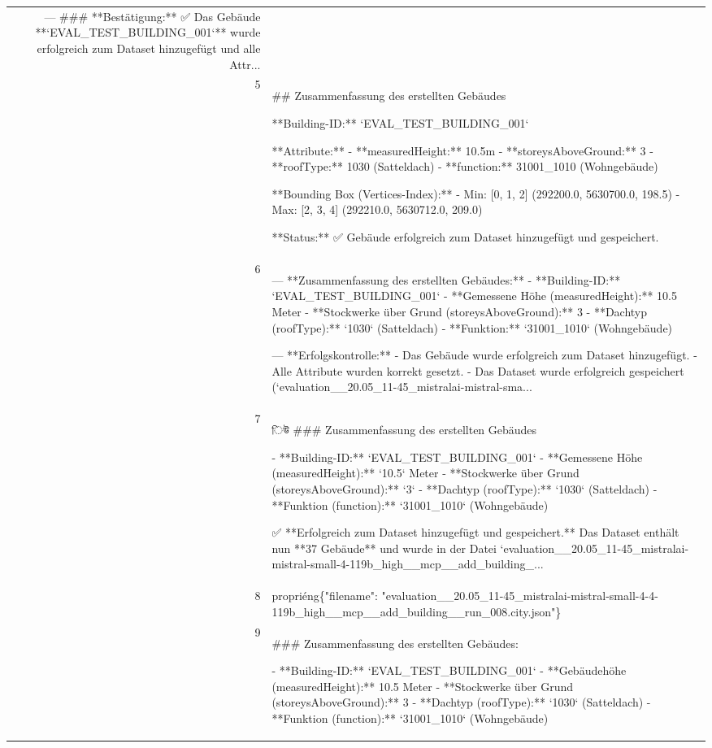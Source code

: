 \documentclass[a4paper,11pt]{article}
\begin{document}
\begin{table}[ht]
\begin{tabular}{r p{12cm}}
---
\#\#\# **Bestätigung:**
✅ Das Gebäude **`EVAL\_TEST\_BUILDING\_001`** wurde erfolgreich zum Dataset hinzugefügt und alle Attr... \\
5 & \#\# Zusammenfassung des erstellten Gebäudes

**Building-ID:** `EVAL\_TEST\_BUILDING\_001`

**Attribute:**
- **measuredHeight:** 10.5m
- **storeysAboveGround:** 3
- **roofType:** 1030 (Satteldach)
- **function:** 31001\_1010 (Wohngebäude)

**Bounding Box (Vertices-Index):**
- Min: [0, 1, 2] (292200.0, 5630700.0, 198.5)
- Max: [2, 3, 4] (292210.0, 5630712.0, 209.0)

**Status:** ✅ Gebäude erfolgreich zum Dataset hinzugefügt und gespeichert. \\
6 & ---
**Zusammenfassung des erstellten Gebäudes:**
- **Building-ID:** `EVAL\_TEST\_BUILDING\_001`
- **Gemessene Höhe (measuredHeight):** 10.5 Meter
- **Stockwerke über Grund (storeysAboveGround):** 3
- **Dachtyp (roofType):** `1030` (Satteldach)
- **Funktion:** `31001\_1010` (Wohngebäude)

---
**Erfolgskontrolle:**
- Das Gebäude wurde erfolgreich zum Dataset hinzugefügt.
- Alle Attribute wurden korrekt gesetzt.
- Das Dataset wurde erfolgreich gespeichert (`evaluation\_\_20.05\_11-45\_mistralai-mistral-sma... \\
7 & িউ
\#\#\# Zusammenfassung des erstellten Gebäudes

- **Building-ID:** `EVAL\_TEST\_BUILDING\_001`
- **Gemessene Höhe (measuredHeight):** `10.5` Meter
- **Stockwerke über Grund (storeysAboveGround):** `3`
- **Dachtyp (roofType):** `1030` (Satteldach)
- **Funktion (function):** `31001\_1010` (Wohngebäude)

✅ **Erfolgreich zum Dataset hinzugefügt und gespeichert.**
Das Dataset enthält nun **37 Gebäude** und wurde in der Datei `evaluation\_\_20.05\_11-45\_mistralai-mistral-small-4-119b\_high\_\_mcp\_\_add\_building\_... \\
8 &  propriéng\{"filename": "evaluation\_\_20.05\_11-45\_mistralai-mistral-small-4-4-119b\_high\_\_mcp\_\_add\_building\_\_run\_008.city.json"\} \\
9 & \#\#\# Zusammenfassung des erstellten Gebäudes:

- **Building-ID:** `EVAL\_TEST\_BUILDING\_001`
- **Gebäudehöhe (measuredHeight):** 10.5 Meter
- **Stockwerke über Grund (storeysAboveGround):** 3
- **Dachtyp (roofType):** `1030` (Satteldach)
- **Funktion (function):** `31001\_1010` (Wohngebäude)


\end{tabular}
\end{table}
\end{document}
